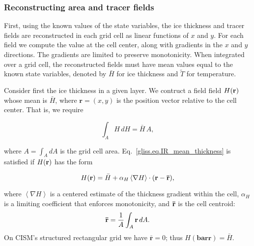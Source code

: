 \subsubsection{Reconstructing area and tracer fields}
\label{sc:glissade-IR-reconstruct}

First, using the known values of the state variables, the ice thickness
and tracer fields are reconstructed in each grid cell as linear
functions of $x$ and $y$. For each field we compute the value at
the cell center, along with gradients in the
$x$ and $y$ directions. The gradients are limited to preserve
monotonicity.  When integrated over a grid cell, the reconstructed
fields must have mean values equal to the known state variables,
denoted by $\bar{H}$ for ice thickness and $\tilde{T}$ for temperature.

Consider first the ice thickness in a given layer. We contruct a field
field $H({\bf{r}})$ whose mean is $\bar{H}$, where $\mathbf{r} = (x,y)$ 
is the position vector relative to the cell center. That
is, we require

\begin{equation}
  \label{gliss.eq.IR_mean_thickness}
  \int_A H \, dH = {\bar H} \, A,
\end{equation}

\noindent
where $A=\int_A dA$ is the grid cell area.
Eq.~\eqref{gliss.eq.IR_mean_thickness} is satisfied if $H({\bf r})$ has the form

\begin{equation}
  \label{gliss.eq.IR_recon_thickness}
  H({\bf r}) = \bar{H} + \alpha_H \left<\nabla H\right> \cdot ({\bf r}-{\bf \bar{r}}),
\end{equation}

\noindent
where $\left<\nabla H\right>$ is a centered estimate of the thickness
gradient within the cell, $\alpha_H$ is a limiting coefficient that
enforces monotonicity, and ${\bf \bar{r}}$ is the cell centroid:
\[{\bf \bar{r}} = \frac{1}{A} \int_A {\bf r} \, dA.\]
On CISM's structured rectangular grid we have $\mathbf{\bar{r}} = 0$;
thus $H(\mathbf{bar{r}}) = \bar H$.




